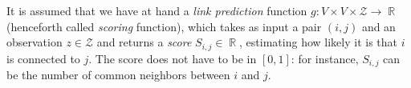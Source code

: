 \documentclass[a4paper, 11pt]{article}
\theoremstyle{remark}
\DeclareMathOperator{\R}{\mathbb{R}}
\DeclareMathOperator{\Dtest}{\cD_{\text{test}}}
\newcommand{\EM}{\ensuremath}
\newcommand{\cD}{\EM{\mathcal{D}}}
\newcommand{\cZ}{\EM{\mathcal{Z}}}
\begin{document}

It is assumed that we have at hand a \textit{link prediction} function $g: V \times V \times  \cZ \rightarrow \R$ (henceforth called \textit{scoring} function), which takes as input a pair $(i,j)$ and an observation $z \in \cZ$ %
and returns a \textit{score} $S_{i,j} \in \R$, estimating how likely it is that $i$ is connected to $j$. The score does not have to be in $[0,1]$: for instance, $S_{i,j}$ can be the number of common neighbors between $i$ and $j$. %


\end{document}

